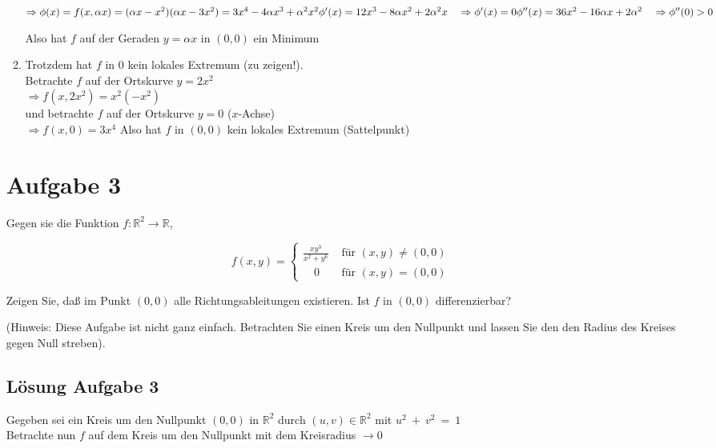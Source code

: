 \documentclass[ngerman, a4paper]{scrartcl}
\begin{document}
\begin{enumerate}[\textbf{\alph*)}]
\begin{enumerate}[\textbf{\alph*)}]
			$
			\Rightarrow \phi(x) = f(x, \alpha x) = (\alpha x-x^2)(\alpha x - 3x^2) = 3x^4 - 4\alpha x^3 + \alpha^2 x^2\\
			\phi'(x) = 12x^3 - 8\alpha x^2 + 2\alpha^2x \quad \Rightarrow \phi^\prime(x) = 0\\
			\phi''(x) = 36x^2 - 16\alpha x + 2\alpha^2 \quad \Rightarrow \phi''(0) > 0
			$
			
			Also hat $f$ auf der Geraden $y = \alpha x $ in $(0,0)$ ein Minimum
			
			\item Trotzdem hat $f$ in 0 kein lokales Extremum (zu zeigen!).\\
			Betrachte $f$ auf der Ortskurve $y = 2x^2$
			\\
			
			$\Rightarrow f(x, 2x^2) = x^2(-x^2)$
			\\
			
			und betrachte $f$ auf der Ortskurve $y = 0$ ($x$-Achse) 
			\\
			
			$\Rightarrow f(x, 0) = 3x^4$
			Also hat $f$ in $(0,0)$ kein lokales Extremum (Sattelpunkt)
		\end{enumerate}
	
		\section*{Aufgabe 3}
		Gegen sie die Funktion $f: \mathbb{R}^2 \rightarrow \mathbb{R}$,
		
		\[
			f(x,y) = 
			\begin{cases}
				\tfrac{xy^3}{x^2 + y^6} &\text{ für } (x,y) \ne (0,0)\\
				\quad 0 &\text{ für } (x,y) = (0,0)
			\end{cases}
		\]
		
		Zeigen Sie, daß im Punkt $(0,0)$ alle Richtungsableitungen existieren.
		Ist $f$ in $(0,0)$ differenzierbar?
		
		(Hinweis: Diese Aufgabe ist nicht ganz einfach. Betrachten Sie einen Kreis um den Nullpunkt und lassen Sie den den Radius des Kreises gegen Null  streben).
		
		\subsection*{Lösung Aufgabe 3}
		\begin{figure}[H]
			\centering
		\end{figure}
		Gegeben sei ein Kreis um den Nullpunkt $(0,0)$ in $\mathbb{R}^2$ durch $(u,v)\in \mathbb{R}^2$ mit $u^2~+~v^2~=~1$ \\
		Betrachte nun $f$ auf dem Kreis um den Nullpunkt mit dem Kreisradius $\rightarrow 0$
		

\end{enumerate}
\end{document}
